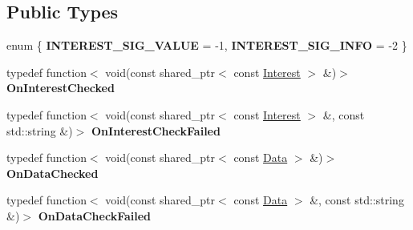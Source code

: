 \subsection*{Public Types}
\begin{DoxyCompactItemize}
\item 
enum \{ {\bfseries I\+N\+T\+E\+R\+E\+S\+T\+\_\+\+S\+I\+G\+\_\+\+V\+A\+L\+UE} = -\/1, 
{\bfseries I\+N\+T\+E\+R\+E\+S\+T\+\_\+\+S\+I\+G\+\_\+\+I\+N\+FO} = -\/2
 \}\hypertarget{classndn_1_1security_1_1conf_1_1Checker_a5d61d7e5b5ada1a5c2638fb963ba1351}{}\label{classndn_1_1security_1_1conf_1_1Checker_a5d61d7e5b5ada1a5c2638fb963ba1351}

\item 
typedef function$<$ void(const shared\+\_\+ptr$<$ const \hyperlink{classndn_1_1Interest}{Interest} $>$ \&)$>$ {\bfseries On\+Interest\+Checked}\hypertarget{classndn_1_1security_1_1conf_1_1Checker_aaa5fa4506939dc22ab62114185172d2e}{}\label{classndn_1_1security_1_1conf_1_1Checker_aaa5fa4506939dc22ab62114185172d2e}

\item 
typedef function$<$ void(const shared\+\_\+ptr$<$ const \hyperlink{classndn_1_1Interest}{Interest} $>$ \&, const std\+::string \&)$>$ {\bfseries On\+Interest\+Check\+Failed}\hypertarget{classndn_1_1security_1_1conf_1_1Checker_a497732cf5523038c956a3ca9f5b9e807}{}\label{classndn_1_1security_1_1conf_1_1Checker_a497732cf5523038c956a3ca9f5b9e807}

\item 
typedef function$<$ void(const shared\+\_\+ptr$<$ const \hyperlink{classndn_1_1Data}{Data} $>$ \&)$>$ {\bfseries On\+Data\+Checked}\hypertarget{classndn_1_1security_1_1conf_1_1Checker_a492cb83f7fa894669460b1a2036e78a8}{}\label{classndn_1_1security_1_1conf_1_1Checker_a492cb83f7fa894669460b1a2036e78a8}

\item 
typedef function$<$ void(const shared\+\_\+ptr$<$ const \hyperlink{classndn_1_1Data}{Data} $>$ \&, const std\+::string \&)$>$ {\bfseries On\+Data\+Check\+Failed}\hypertarget{classndn_1_1security_1_1conf_1_1Checker_aa434d3d96996bf0298c4cd2f67758886}{}\label{classndn_1_1security_1_1conf_1_1Checker_aa434d3d96996bf0298c4cd2f67758886}

\end{DoxyCompactItemize}
